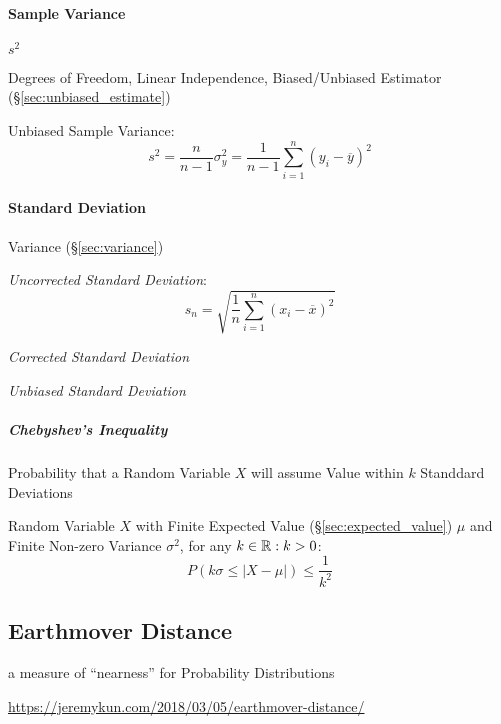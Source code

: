 \paragraph{Sample Variance}\label{sec:variability}\hfill

$s^2$

Degrees of Freedom, Linear Independence, Biased/Unbiased Estimator
(\S\ref{sec:unbiased_estimate})

Unbiased Sample Variance:
\[
  s^2 = \frac{n}{n-1}\sigma^2_y =
  \frac{1}{n-1} \sum_{i=1}^n (y_i - \overline{y})^2
\]



\paragraph{Standard Deviation}\label{sec:standard_deviation}\hfill

Variance (\S\ref{sec:variance})

\emph{Uncorrected Standard Deviation}:
\[
  s_n = \sqrt{\frac{1}{n}\sum_{i=1}^n (x_i - \overline{x})^2}
\]

\emph{Corrected Standard Deviation}

\emph{Unbiased Standard Deviation}



\subparagraph{Chebyshev's Inequality}\label{sec:chebyshevs_inequality}
\hfill

Probability that a Random Variable $X$ will assume Value within $k$
Standdard Deviations

Random Variable $X$ with Finite Expected Value
(\S\ref{sec:expected_value}) $\mu$ and Finite Non-zero Variance
$\sigma^2$, for any $k \in \mathbb{R} : k > 0$:
\[
  P(k\sigma \leq |X - \mu|) \leq \frac{1}{k^2}
\]



\subsection{Earthmover Distance}\label{sec:earthmover_distance}


a measure of ``nearness'' for Probability Distributions

\url{https://jeremykun.com/2018/03/05/earthmover-distance/}



